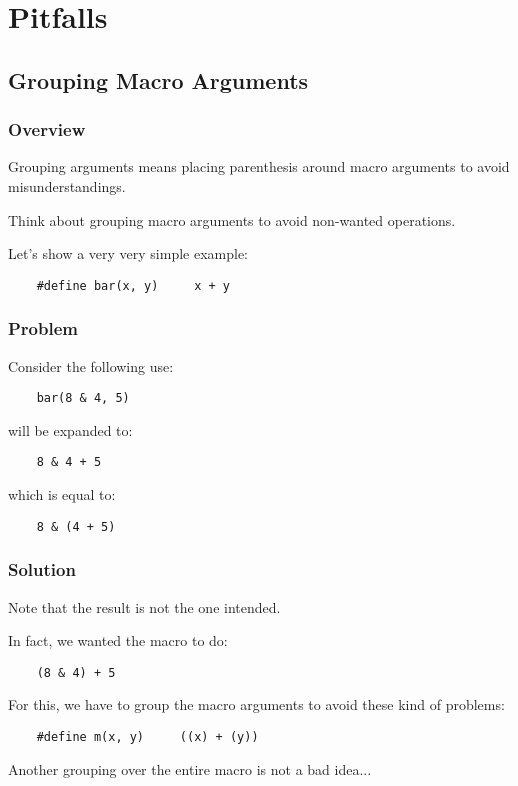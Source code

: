 \documentclass[8pt]{beamer}
\newcommand{\nl}[0]{\vspace{0.4cm}}
\begin{document}
\section{Pitfalls}

%
%

\subsection{Grouping Macro Arguments}


\begin{frame}[containsverbatim]
  \frametitle{Overview}

  Grouping arguments means placing parenthesis around macro arguments
  to avoid misunderstandings.

  \nl

  Think about grouping macro arguments to avoid non-wanted operations.

  \nl

  Let's show a very very simple example:

  \begin{verbatim}
    #define bar(x, y)     x + y
  \end{verbatim}
\end{frame}


\begin{frame}[containsverbatim]
  \frametitle{Problem}

  Consider the following use:

  \begin{verbatim}
    bar(8 & 4, 5)
  \end{verbatim}

  will be expanded to:

  \begin{verbatim}
    8 & 4 + 5
  \end{verbatim}

  which is equal to:

  \begin{verbatim}
    8 & (4 + 5)
  \end{verbatim}
\end{frame}


\begin{frame}[containsverbatim]
  \frametitle{Solution}

  Note that the result is not the one intended.

  \nl

  In fact, we wanted the macro to do:

  \begin{verbatim}
    (8 & 4) + 5
  \end{verbatim}

  For this, we have to group the macro arguments to avoid these kind of
  problems:

  \begin{verbatim}
    #define m(x, y)     ((x) + (y))
  \end{verbatim}

  Another grouping over the entire macro is not a bad idea...
\end{frame}
\end{document}
